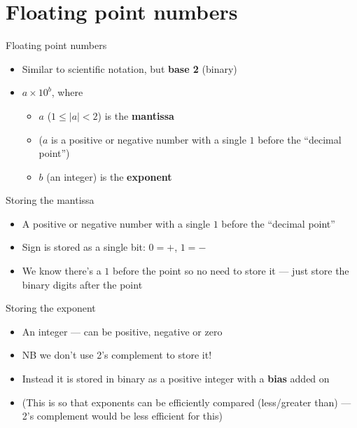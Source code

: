\part{Floating point numbers}
\frame{\partpage}

\begin{frame}{Floating point numbers}
	\begin{itemize}
		\pause\item Similar to scientific notation, but \textbf{base 2} (binary)
		\pause\item $a \times 10^b$, where
			\begin{itemize}
				\pause\item $a$ ($1 \leq |a| < 2$) is the \textbf{mantissa}
				\pause\item ($a$ is a positive or negative number
					with a single $1$ before the ``decimal point'')
				\pause\item $b$ (an integer) is the \textbf{exponent}
			\end{itemize}
	\end{itemize}
\end{frame}

\begin{frame}{Storing the mantissa}
	\begin{itemize}
		\pause\item A positive or negative number with a single $1$ before the ``decimal point''
		\pause\item Sign is stored as a single bit: $0=+$, $1=-$
		\pause\item We know there's a $1$ before the point so no need to store it --- just store the binary
			digits after the point
	\end{itemize}
\end{frame}

\begin{frame}{Storing the exponent}
	\begin{itemize}
		\pause\item An integer --- can be positive, negative or zero
		\pause\item NB we don't use 2's complement to store it!
		\pause\item Instead it is stored in binary as a positive integer with a \textbf{bias} added on
		\pause\item (This is so that exponents can be efficiently compared (less/greater than)
			--- 2's complement would be less efficient for this)
	\end{itemize}
\end{frame}

